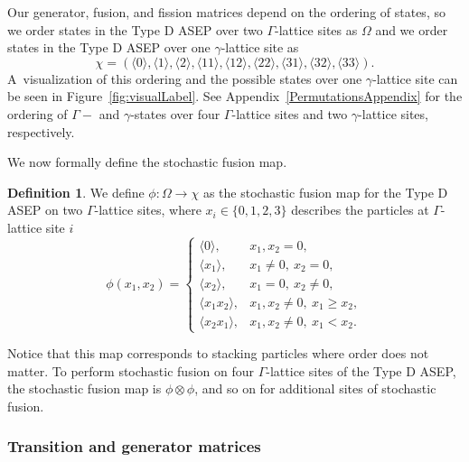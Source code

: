\documentclass[pdftex]{sigma}
\numberwithin{equation}{section}
\theoremstyle{definition}
\newtheorem{Definition}[Theorem]{Definition}
\begin{document}
Our generator, fusion, and fission matrices depend on the ordering of states, so we order states in the Type D ASEP over two $\Gamma$-lattice sites as $\Omega$ and we order states in the Type D ASEP over one $\gamma$-lattice site as
\[\chi = ( \langle 0 \rangle,\langle 1 \rangle, \langle 2 \rangle, \langle 11 \rangle, \langle 12 \rangle, \langle 22 \rangle,\langle 31 \rangle,\langle 32 \rangle, \langle 33 \rangle ). \]
 A~visualization of this ordering and the possible states over one $\gamma$-lattice site can be seen in Figure~\ref{fig:visualLabel}. See Appendix~\ref{PermutationsAppendix} for the ordering of $\Gamma-$ and $\gamma$-states over four $\Gamma$-lattice sites and two $\gamma$-lattice sites, respectively.

We now formally define the stochastic fusion map.

\begin{Definition}
\label{StochasticDef}
We define $\phi\colon\Omega \rightarrow \chi$ as the stochastic fusion map for the Type D ASEP on two $\Gamma$-lattice sites, where $x_i \in \{0,1,2,3\}$ describes the particles at $\Gamma$-lattice site $i$
\[
\phi(x_1,x_2)= \begin{cases}
 \langle 0 \rangle, & x_1,x_2 = 0 ,\\
 \langle x_1 \rangle, & x_1 \neq 0, \ x_2 = 0 ,\\
 \langle x_2 \rangle ,& x_1 = 0, \ x_2 \neq 0 , \\
 \langle x_1x_2 \rangle, & x_1,x_2 \neq 0, \ x_1 \geq x_2, \\
 \langle x_2x_1 \rangle ,& x_1,x_2 \neq 0, \ x_1 < x_2.
 \end{cases}
\]
\end{Definition}

Notice that this map corresponds to stacking particles where order does not matter. To perform stochastic fusion on four $\Gamma$-lattice sites of the Type D ASEP, the stochastic fusion map is $\phi \otimes \phi$, and so on for additional sites of stochastic fusion.

\subsubsection{Transition and generator matrices} \label{transition-gen}
\end{document}
